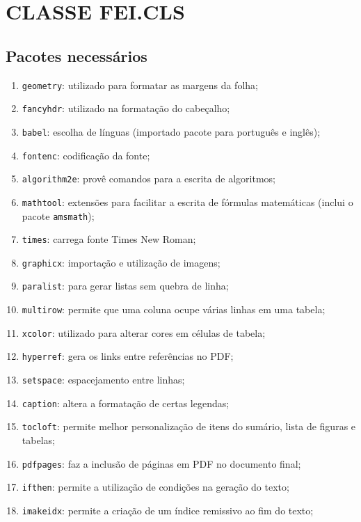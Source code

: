 \chapter{CLASSE FEI.CLS}\label{chap:classe}

\section{Pacotes necessários}\label{sec:pacotes}
    
    \begin{enumerate}
        \item\verb+geometry+: utilizado para formatar as margens da folha;
        \item\verb+fancyhdr+: utilizado na formatação do cabeçalho;
        \item\verb+babel+: escolha de línguas (importado pacote para português e inglês);
        \item\verb+fontenc+: codificação da fonte;
        \item\verb+algorithm2e+: provê comandos para a escrita de algoritmos;
        \item\verb+mathtool+: extensões para facilitar a escrita de fórmulas matemáticas (inclui o pacote \verb+amsmath+);
        \item\verb+times+: carrega fonte Times New Roman;
        \item\verb+graphicx+: importação e utilização de imagens;
        \item\verb+paralist+: para gerar listas sem quebra de linha;
        \item\verb+multirow+: permite que uma coluna ocupe várias linhas em uma tabela;
        \item\verb+xcolor+: utilizado para alterar cores em células de tabela;
        \item\verb+hyperref+: gera os links entre referências no PDF;
        \item\verb+setspace+: espacejamento entre linhas;
        \item\verb+caption+: altera a formatação de certas legendas;
        \item\verb+tocloft+: permite melhor personalização de itens do sumário, lista de figuras e tabelas;
        \item\verb+pdfpages+: faz a inclusão de páginas em PDF no documento final;
        \item\verb+ifthen+: permite a utilização de condições na geração do texto;
        \item\verb+imakeidx+: permite a criação de um índice remissivo ao fim do texto;
    \end{enumerate}


